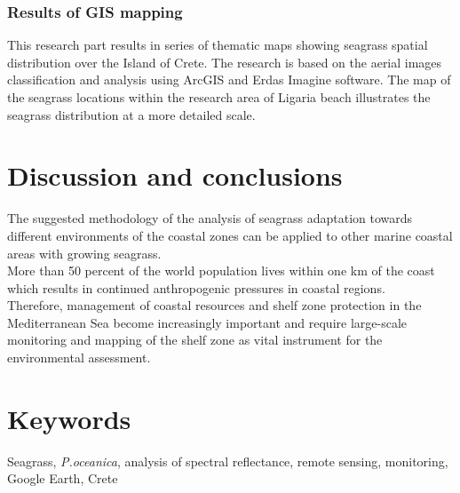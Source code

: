 \documentclass[10pt, a4paper]{article}
\begin{document}
\subsubsection{Results of GIS mapping}
This research part results in series of thematic maps showing seagrass spatial distribution over the Island of
Crete. The research is based on the aerial images classification and analysis using ArcGIS and Erdas Imagine
software. The map of the seagrass locations within the research area of Ligaria beach illustrates the seagrass
distribution at a more detailed scale.

\pagebreak
\section{Discussion and conclusions}
The suggested methodology of the analysis of seagrass adaptation towards different environments of
the coastal zones can be applied to other marine coastal areas with growing seagrass.\\
More than 50 percent of the world population lives within one km of the coast which results in continued
anthropogenic pressures in coastal regions. \\Therefore, management of coastal resources and shelf
zone protection in the Mediterranean Sea become increasingly important and require large-scale
monitoring and mapping of the shelf zone as vital instrument for the environmental assessment.
\pagebreak

\section{Keywords}
Seagrass, \textit{\textit{P.oceanica}}, analysis of spectral reflectance, remote sensing, monitoring, Google Earth, Crete
\pagebreak
\end{document}
